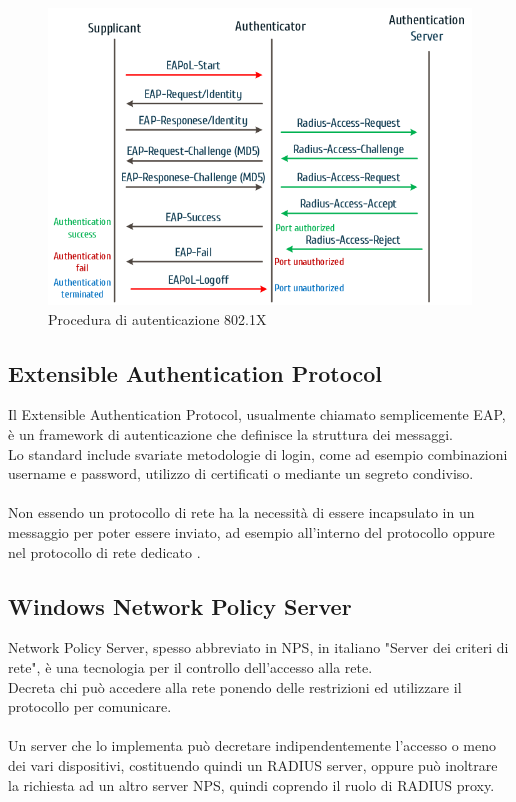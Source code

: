 \documentclass[Tesi.tex]{subfiles}
\begin{document}
\begin{figure}[H]
	\centering
	\includegraphics[width=0.78\linewidth]{"images/8021x-Authentication-message-flow"}
	\caption{Procedura di autenticazione 802.1X}
	\label{fig:Procedura di autenticazione 802.1X}
\end{figure}


\subsection{Extensible Authentication Protocol}
Il Extensible Authentication Protocol, usualmente chiamato semplicemente EAP, è un framework di autenticazione che definisce la struttura dei messaggi. \\
Lo standard include svariate metodologie di login, come ad esempio combinazioni username e password, utilizzo di certificati o mediante un segreto condiviso. \\\\
Non essendo un protocollo di rete ha la necessità di essere incapsulato in un messaggio per poter essere inviato, ad esempio all'interno del protocollo  oppure nel protocollo di rete dedicato .

\subsection{Windows Network Policy Server}
Network Policy Server, spesso abbreviato in NPS, in italiano "Server dei criteri di rete", è una tecnologia per il controllo dell'accesso alla rete. \\
Decreta chi può accedere alla rete ponendo delle restrizioni ed utilizzare il protocollo  per comunicare. \\\\
Un server che lo implementa può decretare indipendentemente l'accesso o meno dei vari dispositivi, costituendo quindi un RADIUS server, oppure può inoltrare la richiesta ad un altro server NPS, quindi coprendo il ruolo di RADIUS proxy.
\end{document}
